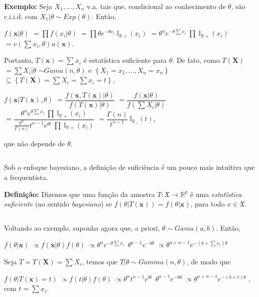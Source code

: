 \documentclass[
]{book}
\begin{document}
\(~\)

\textbf{Exemplo:} Seja \(X_1,\ldots,X_n\) v.a. tais que, condicional ao conhecimento de \(\theta\), são c.i.i.d. com \(X_1|\theta \sim Exp(\theta)\). Então,

\(f(\boldsymbol x|\theta)\) \(=\prod f(x_i|\theta)\) \(=\prod \theta e^{-\theta x_i} ~\mathbb{I}_{\mathbb{R+}}(x_i)\) \(=\theta^n e^{-\theta \sum x_i} ~\prod ~\mathbb{I}_{\mathbb{R+}}(x_i)\) \(= v\left(\sum x_i, \theta\right) u(\boldsymbol x)\).

Portanto, \(T(\boldsymbol x) = \sum x_i\) é estatística suficiente para \(\theta\). De fato, como \(T(\boldsymbol X)\) \(= \sum X_i | \theta\) \(\sim Gama(n,\theta)\) e \(\left\{X_1=x_1,\ldots,X_n=x_n\right\}\) \(\subseteq \left\{T(\boldsymbol X) = \sum X_i = \sum x_i = t\right\}\),

\(f\left(\boldsymbol x| T(\boldsymbol x),\theta\right)\) \(=\dfrac{f\left(\boldsymbol{x},T(\boldsymbol{x})|\theta\right)}{f\left(T(\boldsymbol{x})|\theta\right)}\) \(=\dfrac{f\left(\boldsymbol{x}|\theta\right)}{f\left(\sum{X_i}|\theta\right)}\) \(=\dfrac{\theta^n e^{\theta \sum x_i} ~\prod ~\mathbb{I}_{\mathbb{R+}}(x_i)}{\frac{\theta^n}{\Gamma(n)}t^{n-1} e^{\theta t} ~\prod ~\mathbb{I}_{\mathbb{R+}}(x_i)}\) \(= \dfrac{\Gamma(n)}{t^{n-1}} ~\mathbb{I}_{\mathbb{R}_+}\left(t\right)\),

que não depende de \(\theta\).

\(~\)

Sob o enfoque bayesiano, a definição de suficiência é um pouco mais intuitiva que a frequentista.

\textbf{Definição:} Dizemos que uma função da amostra \(T:\mathfrak{X} \rightarrow \mathbb{R}^p\) é uma \emph{estatística suficiente} (no sentido \emph{bayesiano}) se \(f\left(\theta | T(\boldsymbol x)\right) = f\left(\theta | \boldsymbol x\right)\), para todo \(x \in \mathfrak{X}\).

\(~\)

Voltando ao exemplo, suponha agora que, a priori, \(\theta \sim Gama(a,b)\). Então,

\(f(\theta| \boldsymbol x)\) \(\propto f(\boldsymbol x|\theta)f(\theta)\) \(\propto \theta^n e^{-\theta \sum x_i} ~~\theta^{a-1}e^{-b\theta}\) \(\propto \theta^{a+n-1} e^{-(b+\sum x_i)\theta}\)

Seja \(T = T(\boldsymbol X) = \sum X_i\), temos que \(T|\theta\sim Gamma(n,\theta)\), de modo que

\(f\left(\theta| T(\boldsymbol x)=t\right)\) \(\propto f(t|\theta)f(\theta)\) \(\propto \theta^n t^{n-1} e^{\theta t} ~~\theta^{a-1}e^{-b\theta}\) \(\propto \theta^{a+n-1} e^{-(b+t)\theta}\) , com \(t=\sum x_i\).
\end{document}

